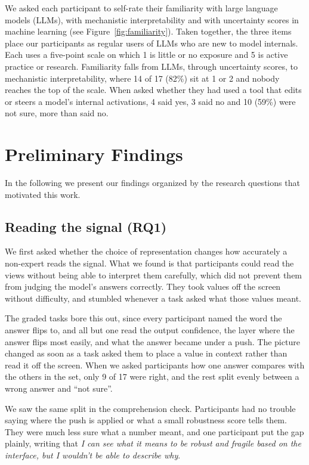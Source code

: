 \documentclass[sigconf]{acmart}
\newcommand{\pq}[1]{\emph{\guillemotleft #1\guillemotright}}
\begin{document}
We asked each participant to self-rate their familiarity with large language models (LLMs), with mechanistic
interpretability and with uncertainty scores in machine learning (see Figure~\ref{fig:familiarity}). Taken
together, the three items place our participants as regular users of LLMs who are new to model internals. Each
uses a five-point scale on which 1 is little or no exposure and 5 is active practice or research. Familiarity
falls from LLMs, through uncertainty scores, to mechanistic interpretability, where 14 of 17 (82\%) sit at 1 or
2 and nobody reaches the top of the scale. When asked whether they had used a tool that edits or steers a
model's internal activations, 4 said yes, 3 said no and 10 (59\%) were not sure, more than said no.

\section{Preliminary Findings}

In the following we present our findings organized by the research questions that motivated this work.

\subsection{Reading the signal (RQ1)}

We first asked whether the choice of representation changes how accurately a non-expert reads the signal. What
we found is that participants could read the views without being able to interpret them carefully, which did not
prevent them from judging the model's answers correctly. They took values off the screen without difficulty, and
stumbled whenever a task asked what those values meant.

The graded tasks bore this out, since every participant named the word the answer flips to, and all but one read
the output confidence, the layer where the answer flips most easily, and what the answer became under a push.
The picture changed as soon as a task asked them to place a value in context rather than read it off the screen.
When we asked participants how one answer compares with the others in the set, only 9 of 17 were right, and the
rest split evenly between a wrong answer and ``not sure''.

We saw the same split in the comprehension check. Participants had no trouble saying where the push is applied
or what a small robustness score tells them. They were much less sure what a number meant, and one participant
put the gap plainly, writing that \pq{I can see what it means to be robust and fragile based on the interface,
but I wouldn't be able to describe why}.
\end{document}
